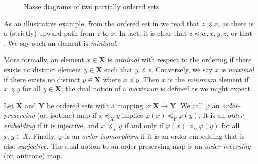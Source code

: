 \begin{figure}[H]
  \centering
  \small
  \begin{subfigure}{0.3\textwidth}
    \centering
    \label{subfigure:partial-order-a}
  \end{subfigure}%
  \begin{subfigure}{0.3\textwidth}
    \centering
    \label{subfigure:partial-order-b}
  \end{subfigure}%
  \caption{Hasse diagrams of two partially ordered sets}
  \label{figure:hasse-diagram}
\end{figure}

As an illustrative example, from the ordered set in  we read that $z \preceq x$, as there is a (strictly) upward path from $z$ to $x$. In fact, it is clear that $z \preceq w, x,y,z$, or that . We say such an element is \textit{minimal}.

More formally, an element $x \in \mathbf{X}$ is \textit{minimal} with respect to the ordering if there exists no distinct element $y \in \mathbf{X}$ such that $y \preceq x$. Conversely, we say $x$ is \textit{maximal} if there exists no distinct $y \in \mathbf{X}$ where $x \preceq y$. Then $x$ is the \textit{minimum} element if $x \preceq y$ for all $y \in \mathbf{X}$; the dual notion of a \textit{maximum} is defined as we might expect.    

\begin{definition}
  \label{definition:order-maps}

       
  Let $\mathbf{X}$ and $\mathbf{Y}$ be ordered sets with a mapping $\varphi : \mathbf{X} \to \mathbf{Y}$. We call $\varphi$ an \textit{order-preserving} (or, isotone) map if $x \preceq_X y$ implies $\varphi(x) \preceq_Y \varphi(y)$. It is an \textit{order-embedding} if it is injective, and $x \preceq_X y$ if and only if $\varphi(x) \preceq_Y \varphi(y)$ for all $x,y \in X$. Finally, $\varphi$ is an \textit{order-isomorphism} if it is an order-embedding that is also \textit{surjective}. The dual notion to an order-preserving map is an \textit{order-reversing} (or, antitone) map. 
\end{definition}

